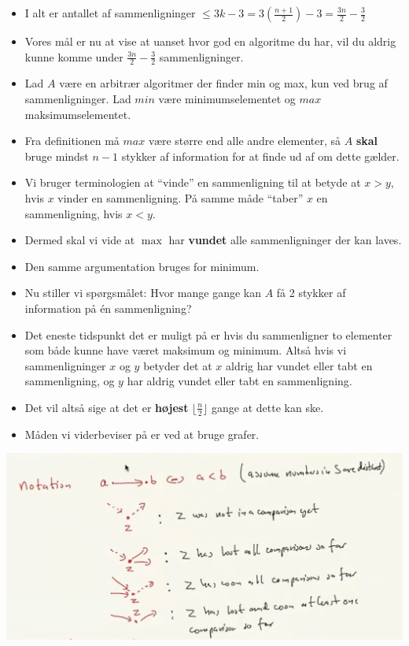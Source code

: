 \begin{frame}[allowframebreaks]
\begin{itemize}
		\item I alt er antallet af sammenligninger $\le 3k-3 = 3(\frac{n+1}{2})-3 = \frac{3n}{2} - \frac{3}{2}$
		\item Vores mål er nu at vise at uanset hvor god en algoritme du har, vil du aldrig kunne komme under $\frac{3n}{2} - \frac{3}{2}$ sammenligninger.
		\item Lad $A$ være en arbitrær algoritmer der finder min og max, kun ved brug af sammenligninger. Lad $min$ være minimumselementet og $max$ maksimumselementet.
		\item Fra definitionen må $max$ være større end alle andre elementer, så $A$ \textbf{skal} bruge mindst $n-1$ stykker af information for at finde ud af om dette gælder.
		\item Vi bruger terminologien at ``vinde'' en sammenligning til at betyde at $x > y$, hvis $x$ vinder en sammenligning. På samme måde ``taber'' $x$ en sammenligning, hvis $x < y$.
		\item Dermed skal vi vide at $\max$ har \textbf{vundet} alle sammenligninger der kan laves.
		\item Den samme argumentation bruges for minimum.
		\item Nu stiller vi spørgsmålet: Hvor mange gange kan $A$ få 2 stykker af information på én sammenligning?
		\item Det eneste tidspunkt det er muligt på er hvis du sammenligner to elementer som både kunne have været maksimum og minimum. Altså hvis vi sammenligninger $x$ og $y$ betyder det at $x$ aldrig har vundet eller tabt en sammenligning, og $y$ har aldrig vundet eller tabt en sammenligning.
		\item Det vil altså sige at det er \textbf{højest} $\lfloor \frac{n}{2} \rfloor$ gange at dette kan ske.
		\item Måden vi viderbeviser på er ved at bruge grafer.
	\end{itemize}
	\begin{center}
		\includegraphics[scale=0.3]{figur/vid22a.png}

\end{center}
\end{frame}
